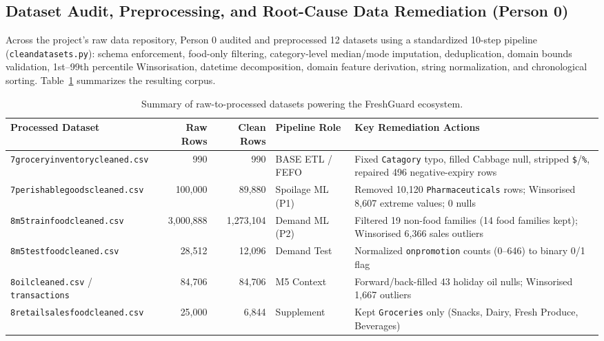 \documentclass[11pt,a4paper]{article}
\renewcommand{\_}{\oldunderscore\allowbreak}
\begin{document}
\subsection{Dataset Audit, Preprocessing, and Root-Cause Data Remediation (Person 0)}
Across the project's raw data repository, Person 0 audited and preprocessed 12 datasets using a standardized 10-step pipeline (\texttt{clean\_datasets.py}): schema enforcement, food-only filtering, category-level median/mode imputation, deduplication, domain bounds validation, 1st--99th percentile Winsorisation, datetime decomposition, domain feature derivation, string normalization, and chronological sorting. Table~\ref{tab:datasets} summarizes the resulting corpus.

\begin{table}[H]
\centering
\caption{Summary of raw-to-processed datasets powering the FreshGuard ecosystem.}
\label{tab:datasets}
\renewcommand{\arraystretch}{1.15}
{\scriptsize
\begin{tabularx}{\textwidth}{@{} l r r l >{\raggedright\arraybackslash}X @{}}
\toprule
\rowcolor{NavyPrimary}
\color{white}\textbf{Processed Dataset} & \color{white}\textbf{Raw Rows} & \color{white}\textbf{Clean Rows} & \color{white}\textbf{Pipeline Role} & \color{white}\textbf{Key Remediation Actions} \\
\midrule
\texttt{7\_grocery\_inventory\_cleaned.csv} & 990 & 990 & BASE ETL / FEFO & Fixed \texttt{Catagory} typo, filled Cabbage null, stripped \texttt{\$}/\texttt{\%}, repaired 496 negative-expiry rows \\
\rowcolor{LightBg}
\texttt{7\_perishable\_goods\_cleaned.csv} & 100,000 & 89,880 & Spoilage ML (P1) & Removed 10,120 \texttt{Pharmaceuticals} rows; Winsorised 8,607 extreme values; 0 nulls \\
\texttt{8\_m5\_train\_food\_cleaned.csv} & 3,000,888 & 1,273,104 & Demand ML (P2) & Filtered 19 non-food families (14 food families kept); Winsorised 6,366 sales outliers \\
\rowcolor{LightBg}
\texttt{8\_m5\_test\_food\_cleaned.csv} & 28,512 & 12,096 & Demand Test & Normalized \texttt{onpromotion} counts (0--646) to binary 0/1 flag \\
\texttt{8\_oil\_cleaned.csv} / \texttt{transactions} & 84,706 & 84,706 & M5 Context & Forward/back-filled 43 holiday oil nulls; Winsorised 1,667 outliers \\
\rowcolor{LightBg}
\texttt{8\_retail\_sales\_food\_cleaned.csv} & 25,000 & 6,844 & Supplement & Kept \texttt{Groceries} only (Snacks, Dairy, Fresh Produce, Beverages) \\

\end{tabularx}}
\end{table}
\end{document}
